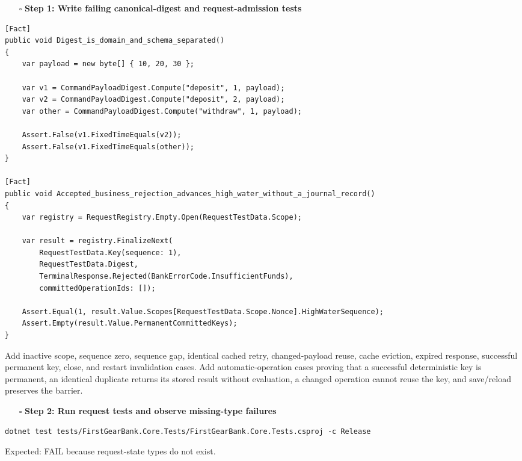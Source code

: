\documentclass[
  10pt,
  letterpaper,
]{article}
\providecommand{\tightlist}{%
  \setlength{\itemsep}{0pt}\setlength{\parskip}{0pt}}
\begin{document}
\begin{itemize}
\tightlist
\item[$\square$]
  \textbf{Step 1: Write failing canonical-digest and request-admission
  tests}
\end{itemize}

\begin{lstlisting}
[Fact]
public void Digest_is_domain_and_schema_separated()
{
    var payload = new byte[] { 10, 20, 30 };

    var v1 = CommandPayloadDigest.Compute("deposit", 1, payload);
    var v2 = CommandPayloadDigest.Compute("deposit", 2, payload);
    var other = CommandPayloadDigest.Compute("withdraw", 1, payload);

    Assert.False(v1.FixedTimeEquals(v2));
    Assert.False(v1.FixedTimeEquals(other));
}

[Fact]
public void Accepted_business_rejection_advances_high_water_without_a_journal_record()
{
    var registry = RequestRegistry.Empty.Open(RequestTestData.Scope);

    var result = registry.FinalizeNext(
        RequestTestData.Key(sequence: 1),
        RequestTestData.Digest,
        TerminalResponse.Rejected(BankErrorCode.InsufficientFunds),
        committedOperationIds: []);

    Assert.Equal(1, result.Value.Scopes[RequestTestData.Scope.Nonce].HighWaterSequence);
    Assert.Empty(result.Value.PermanentCommittedKeys);
}
\end{lstlisting}

Add inactive scope, sequence zero, sequence gap, identical cached retry,
changed-payload reuse, cache eviction, expired response, successful
permanent key, close, and restart invalidation cases. Add
automatic-operation cases proving that a successful deterministic key is
permanent, an identical duplicate returns its stored result without
evaluation, a changed operation cannot reuse the key, and save/reload
preserves the barrier.

\begin{itemize}
\tightlist
\item[$\square$]
  \textbf{Step 2: Run request tests and observe missing-type failures}
\end{itemize}

\begin{lstlisting}
dotnet test tests/FirstGearBank.Core.Tests/FirstGearBank.Core.Tests.csproj -c Release
\end{lstlisting}

Expected: FAIL because request-state types do not exist.
\end{document}
